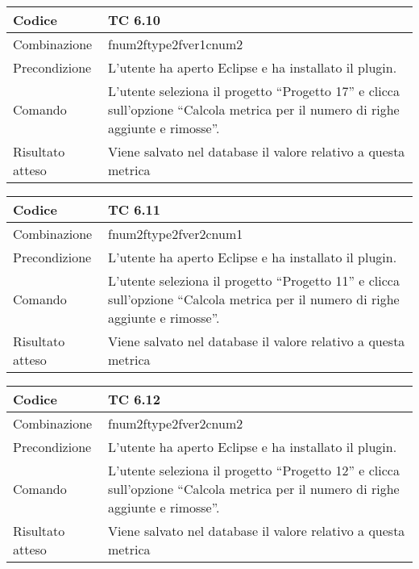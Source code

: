 \begin{table}[ht]
\begin{tabular}{|p{3cm}|p{9cm}|}
\hline
\cellcolor{lightgray}Codice				& TC 6.10								\\
\hline
\cellcolor{lightgray}Combinazione		& fnum2ftype2fver1cnum2 									\\
\hline
\cellcolor{lightgray}Precondizione		& L'utente ha aperto Eclipse e ha installato il plugin.				\\
\hline
\cellcolor{lightgray}Comando			& L'utente seleziona il progetto ``Progetto 17''  e clicca sull'opzione ``Calcola metrica per il numero di righe aggiunte e rimosse''.	\\
\hline
\cellcolor{lightgray}Risultato atteso	& Viene salvato nel database il valore relativo a questa metrica	\\
\hline
\end{tabular}
\end{table}

\begin{table}[ht]
\begin{tabular}{|p{3cm}|p{9cm}|}
\hline
\cellcolor{lightgray}Codice				& TC 6.11								\\
\hline
\cellcolor{lightgray}Combinazione		& fnum2ftype2fver2cnum1									\\
\hline
\cellcolor{lightgray}Precondizione		& L'utente ha aperto Eclipse e ha installato il plugin.					\\
\hline
\cellcolor{lightgray}Comando			& L'utente seleziona il progetto ``Progetto 11''  e clicca sull'opzione ``Calcola metrica per il numero di righe aggiunte e rimosse''.	\\
\hline
\cellcolor{lightgray}Risultato atteso	& Viene salvato nel database il valore relativo a questa metrica	\\
\hline
\end{tabular}
\end{table}

\begin{table}[ht]
\begin{tabular}{|p{3cm}|p{9cm}|}
\hline
\cellcolor{lightgray}Codice				& TC 6.12								\\
\hline
\cellcolor{lightgray}Combinazione		& fnum2ftype2fver2cnum2								\\
\hline
\cellcolor{lightgray}Precondizione		& L'utente ha aperto Eclipse e ha installato il plugin.			\\
\hline
\cellcolor{lightgray}Comando			& L'utente seleziona il progetto ``Progetto 12''  e clicca sull'opzione ``Calcola metrica per il numero di righe aggiunte e rimosse''.	\\
\hline
\cellcolor{lightgray}Risultato atteso	& Viene salvato nel database il valore relativo a questa metrica	\\
\hline
\end{tabular}
\end{table}

